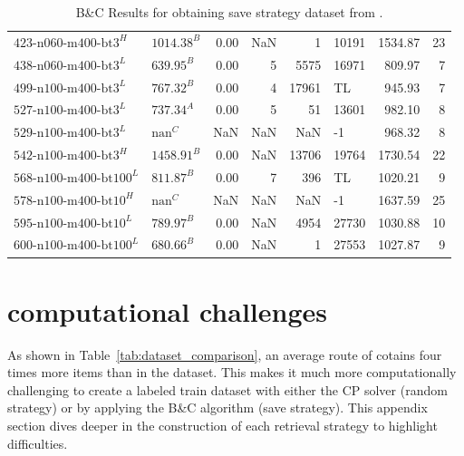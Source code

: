 \begin{table}[ht]
\begin{tabular}{llrrrlrr}
        $\text{423-n060-m400-bt3}^H$   & $\text{1014.38}^B$ & 0.00 & NaN   & 1      & 10191 & 1534.87 & 23    \\
        $\text{438-n060-m400-bt3}^L$   & $\text{639.95}^B$  & 0.00 & 5     & 5575   & 16971 & 809.97  & 7     \\
        $\text{499-n100-m400-bt3}^L$   & $\text{767.32}^B$  & 0.00 & 4     & 17961  & TL    & 945.93  & 7     \\
        $\text{527-n100-m400-bt3}^L$   & $\text{737.34}^A$  & 0.00 & 5     & 51     & 13601 & 982.10  & 8     \\
        $\text{529-n100-m400-bt3}^L$   & $\text{nan}^C$     & NaN  & NaN   & NaN    & -1    & 968.32  & 8     \\
        $\text{542-n100-m400-bt3}^H$   & $\text{1458.91}^B$ & 0.00 & NaN   & 13706  & 19764 & 1730.54 & 22    \\
        $\text{568-n100-m400-bt100}^L$ & $\text{811.87}^B$  & 0.00 & 7     & 396    & TL    & 1020.21 & 9     \\
        $\text{578-n100-m400-bt10}^H$  & $\text{nan}^C$     & NaN  & NaN   & NaN    & -1    & 1637.59 & 25    \\
        $\text{595-n100-m400-bt10}^L$  & $\text{789.97}^B$  & 0.00 & NaN   & 4954   & 27730 & 1030.88 & 10    \\
        $\text{600-n100-m400-bt100}^L$ & $\text{680.66}^B$  & 0.00 & NaN   & 1      & 27553 & 1027.87 & 9     \\
        \bottomrule
    \end{tabular}


    \caption{B\&C Results for obtaining save strategy dataset from \krebsADataSet.}
    \label{tab:bc_results_krebs}
\end{table}

\clearpage

\section{\krebsADataSetText computational challenges}
\label{app:sec:krebs_computationally_challenges}

As shown in Table~\ref{tab:dataset_comparison}, an average route of \krebsADataSetText cotains four times more items than
in the \gendreauDataSet dataset. This makes it much more computationally challenging to create a labeled train dataset with either
the \gls{CP} solver (random strategy) or by applying the B\&C algorithm (save strategy). This appendix section dives deeper in
the construction of each retrieval strategy to highlight difficulties.


